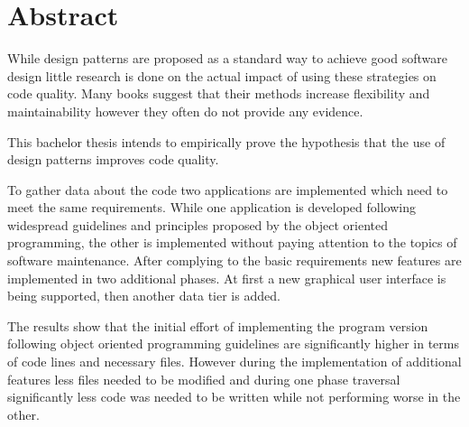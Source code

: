 \chapter{Abstract}

While design patterns are proposed as a standard way to achieve good software design little research is done on the actual impact of using these strategies on code quality. Many books suggest that their methods increase flexibility and maintainability however they often do not provide any evidence. 

This bachelor thesis intends to empirically prove the hypothesis that the use of design patterns improves code quality. 

To gather data about the code two applications are implemented which need to meet the same requirements. While one application is developed following widespread guidelines and principles proposed by the object oriented programming, the other is implemented without paying attention to the topics of software maintenance. After complying to the basic requirements new features are implemented in two additional phases. At first a new graphical user interface is being supported, then another data tier is added.

The results show that the initial effort of implementing the program version following object oriented programming guidelines are significantly higher in terms of code lines and necessary files. However during the implementation of additional features less files needed to be modified and during one phase traversal significantly less code was needed to be written while not performing worse in the other. 

